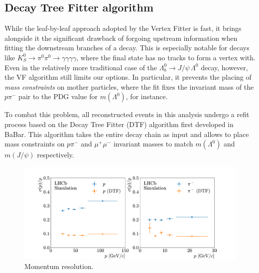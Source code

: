 \subsection{Decay Tree Fitter algorithm}
\label{sec:3:dtf}
While the leaf-by-leaf approach adopted by the Vertex Fitter is fast, it brings alongside it the significant drawback of forgoing upstream information when fitting the downstream branches of a decay.
This is especially notable for decays like $K_S^0 \rightarrow \pi^0\pi^0 \rightarrow \gamma\gamma\gamma\gamma$, where the final state has no tracks to form a vertex with.
Even in the relatively more traditional case of the $\Lambda_b^0 \rightarrow J/\psi\,\Lambda^0$ decay, however, the VF algorithm still limits our options.
In particular, it prevents the placing of \textit{mass constraints} on mother particles, where the fit fixes the invariant mass of the $p\pi^-$ pair to the PDG value for $m(\Lambda^0)$, for instance.

To combat this problem, all reconstructed events in this analysis undergo a refit process based on the Decay Tree Fitter (DTF) algorithm \cite{Hulsbergen:2005pu} first developed in BaBar.
This algorithm takes the entire decay chain as input and allows to place mass constraints on $p\pi^-$ and $\mu^+\mu^-$ invariant masses to match $m(\Lambda^0)$ and $m(J/\psi)$ respectively.


\begin{figure}[t]
	\centering
	\includegraphics[width=\textwidth]{graphics/04-event_selection/paper_momentum_resolutions.pdf}
	\caption[Momentum resolution.]{Momentum resolution.}
	\label{fig:paper_momentum_resolutions}
\end{figure}

